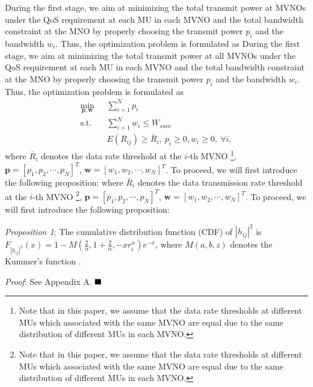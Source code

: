 \documentclass[journal]{IEEEtran}
\begin{document}
\begin{IEEEkeywords}
During the first stage, we aim at minimizing the total transmit power at MVNOs under the QoS requirement at each MU in each MVNO and the total bandwidth constraint at the MNO by properly choosing the transmit power $p_i$ and the bandwidth $w_i$. Thus, the optimization problem is formulated as
During the first stage, we aim at minimizing the total transmit power at all MVNOs under the QoS requirement at each MU in each MVNO and the total bandwidth constraint at the MNO by properly choosing the transmit power $p_i$ and the bandwidth $w_i$. Thus, the optimization problem is formulated as
\begin{subequations}\label{q4}
	\begin{align}
	\min_{\mathbf{p}, \mathbf{w}}\ & \sum\limits_{i = 1}^{N} p_i \\ \mbox{s.t.} \quad &  \sum\limits_{i = 1}^{N} w_i \leq W_{sum}\\ \quad &  E\left({R}_{ij}\right) \geq \bar{R}_i, \ p_i \geq 0, w_i \geq 0, \ \forall i, 
	\end{align}
\end{subequations}
where $\bar{R}_i$ denotes the data rate threshold at the $i$-th MVNO  \footnote{Note that in this paper, we assume that the data rate thresholds at different MUs which associated with the same MVNO are equal due to the same distribution of different MUs in each MVNO.}, $\mathbf{p} = \left[p_1, p_2, \cdots, p_N\right]^T$, $\mathbf{w} = \left[w_1, w_2, \cdots, w_N\right]^T$. To proceed, we will first introduce the following proposition:
where $\bar{R}_i$ denotes the data transmission rate threshold at the $i$-th MVNO  \footnote{Note that in this paper, we assume that the data rate thresholds at different MUs which associated with the same MVNO are equal due to the same distribution of different MUs in each MVNO.}, $\mathbf{p} = \left[p_1, p_2, \cdots, p_N\right]^T$, $\mathbf{w} = \left[w_1, w_2, \cdots, w_N\right]^T$. To proceed, we will first introduce the following proposition:

\textit{Proposition 1}: The cumulative distribution function (CDF) of $\left|h_{ij} \right|^2$ is $F_{\left|h_{ij} \right|^2}\left(x\right) = 1 - M\left(\frac{2}{\alpha}, 1 + \frac{2}{\alpha}, - x r_i^{\alpha}\right)e^{-x}$, where $M\left(a,b,z\right)$ denotes the Kummer's function \cite{MAbramowitz}.


\textit{Proof}: See Appendix A.  $\hfill\blacksquare$


\end{IEEEkeywords}
\end{document}
